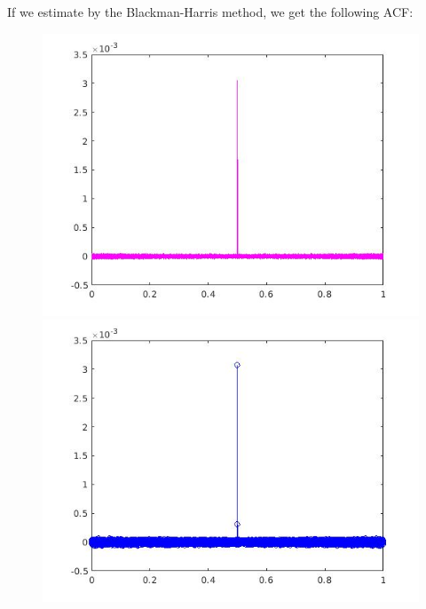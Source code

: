 \documentclass[a4paper,11pt]{article}
\begin{document}
\newpage

If we estimate by the Blackman-Harris method, we get the following ACF:

\begin{figure}[!hp]
\centering
\begin{minipage}{.5\textwidth}
  \centering
  \includegraphics[width=1\linewidth]{images/lab1_20.jpg}
\end{minipage}%
\begin{minipage}{.5\textwidth}
  \centering
  \includegraphics[width=1\linewidth]{images/lab1_21.jpg}
\end{minipage}
\end{figure}
\end{document}
